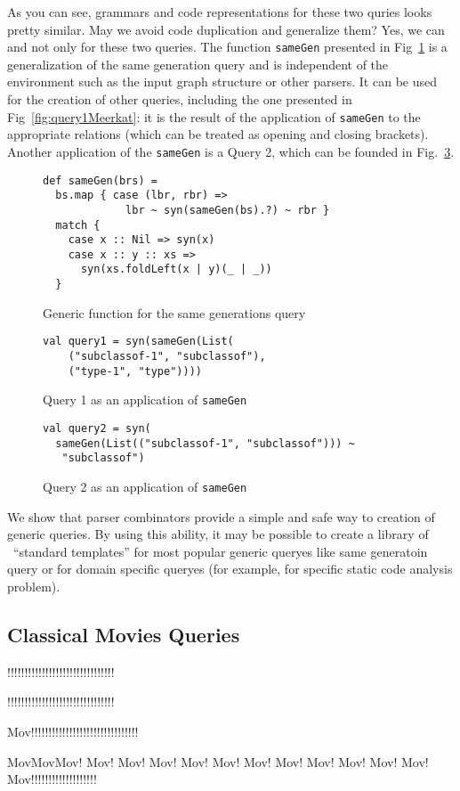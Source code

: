 As you can see, grammars and code representations for these two quries looks pretty similar.
May we avoid code duplication and generalize them? 
Yes, we can and not only for these two queries.
The function \lstinline{sameGen} presented in Fig~\ref{fig:gen} is a generalization of the same generation query and is independent of the environment such as the input graph structure or other parsers.
It can be used for the creation of other queries, including the one presented in Fig~\ref{fig:query1Meerkat}: it is the result of the application of \lstinline{sameGen} to the appropriate relations (which can be treated as opening and closing brackets).
Another application of the \lstinline{sameGen} is a Query 2, which can be founded in Fig.~\ref{fig:query2Gen}.


\begin{figure}[h]
\begin{lstlisting}
def sameGen(brs) =
  bs.map { case (lbr, rbr) => 
             lbr ~ syn(sameGen(bs).?) ~ rbr } 
  match {
    case x :: Nil => syn(x)
    case x :: y :: xs => 
      syn(xs.foldLeft(x | y)(_ | _))
  }
\end{lstlisting}
\caption{Generic function for the same generations query}
\label{fig:gen}
\end{figure}


\begin{figure}[h]
\begin{lstlisting}
val query1 = syn(sameGen(List(
    ("subclassof-1", "subclassof"),
    ("type-1", "type"))))
\end{lstlisting}
\caption{Query 1 as an application of \lstinline{sameGen}}
\label{fig:query1Gen}
\end{figure}


\begin{figure}[h]
\begin{lstlisting}
val query2 = syn(
  sameGen(List(("subclassof-1", "subclassof"))) ~
   "subclassof")
\end{lstlisting}
\caption{Query 2 as an application of \lstinline{sameGen}}
\label{fig:query2Gen}
\end{figure}


We show that parser combinators provide a simple and safe way to creation of generic queries.
By using this ability, it may be possible to create a library of \ ``standard templates'' for most popular generic queryes like same generatoin query or for domain specific queryes (for example, for specific static code analysis problem).


\subsection{Classical Movies Queries}

!!!!!!!!!!!!!!!!!!!!!!!!!!!!!!!

!!!!!!!!!!!!!!!!!!!!!!!!!!!!!!!

Mov!!!!!!!!!!!!!!!!!!!!!!!!!!!!!!!

MovMovMov! Mov! Mov! Mov! Mov! Mov! Mov! Mov! Mov! Mov! Mov! Mov! Mov!!!!!!!!!!!!!!!!!!!
